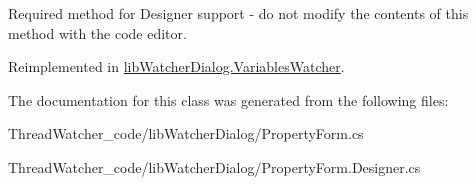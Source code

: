 Required method for Designer support -\/ do not modify the contents of this method with the code editor. 



Reimplemented in \hyperlink{classlib_watcher_dialog_1_1_variables_watcher_a0780649c13902bbc268c4b3625ea280b}{lib\+Watcher\+Dialog.\+Variables\+Watcher}.



The documentation for this class was generated from the following files\+:\begin{DoxyCompactItemize}
\item 
Thread\+Watcher\+\_\+code/lib\+Watcher\+Dialog/Property\+Form.\+cs\item 
Thread\+Watcher\+\_\+code/lib\+Watcher\+Dialog/Property\+Form.\+Designer.\+cs\end{DoxyCompactItemize}
